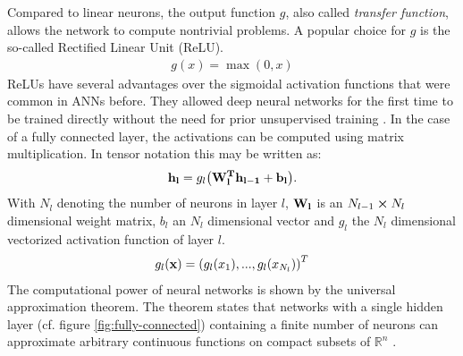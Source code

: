 Compared to linear neurons, the output function $g$, also called \emph{transfer function}, allows the network to compute nontrivial problems. A popular choice for $g$ is the so-called Rectified Linear Unit (ReLU).
\begin{align}
    g(x) = \operatorname{max}(0, x)
\end{align}
ReLUs have several advantages over the sigmoidal activation functions that were common in ANNs before. They allowed deep neural networks for the first time to be trained directly without the need for prior unsupervised training \cite{glorot2011deep}.
In the case of a fully connected layer, the activations can be computed using matrix multiplication. In tensor notation this may be written as:
\begin{align}
    \vb{h_l} = g_l\qty(\vb{W^T_l\vb{h_{l-1}}}+\vb{b_l}).
\end{align}
With $N_l$ denoting the number of neurons in layer $l$, $\vb{W_l}$ is an $N_{l-1}\cp N_l$ dimensional weight matrix, $b_l$ an $N_l$ dimensional vector and $g_l$ the $N_l$ dimensional vectorized activation function of layer $l$.
\begin{align}
    g_l(\vb{x}) = \qty(g_l(x_1),...,g_l(x_{N_l}))^T
\end{align}
The computational power of neural networks is shown by the universal approximation theorem. The theorem states that networks with a single hidden layer (cf. figure \ref{fig:fully-connected}) containing a finite number of neurons can approximate arbitrary continuous functions on compact subsets of $\mathbb{R}^n$ \cite{univ-approx-1,univ-approx-2}.

